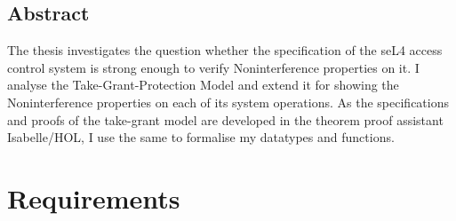 \documentclass[11pt,a4paper,twoside]{book}
\begin{document}
	
\deckblatt
	
	
\declaration
{}

\clearpage
\section*{Abstract}
	
The thesis investigates the question whether the specification of the seL4 access control system is strong enough to verify Noninterference properties on it. I analyse the Take-Grant-Protection Model \cite{TakeG} and extend it for showing the Noninterference properties \cite{InfFlow} on each of its system operations. 
As the specifications and proofs of the take-grant model are developed in the theorem proof assistant Isabelle/HOL, I use the same to formalise my datatypes and functions. 
	

\newpage
\listoffigures
\newpage
\tableofcontents

	
\clearpage

	 
\newpage
\chapter{Requirements}



\newpage
 



\end{document}
